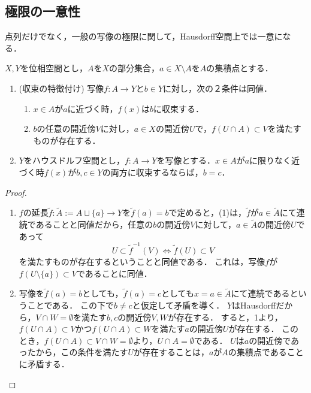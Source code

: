 \documentclass[uplatex,dvipdfmx]{jsreport}
\begin{document}
\subsection{極限の一意性}

\begin{tcolorbox}[colframe=ForestGreen, colback=ForestGreen!10!white,breakable,colbacktitle=ForestGreen!40!white,coltitle=black,fonttitle=\bfseries\sffamily,
title=]
    点列だけでなく，一般の写像の極限に関して，Hausdorff空間上では一意になる．
\end{tcolorbox}

\begin{proposition}[Hausdorff空間では極限は一意的]\label{prop-uniqueness-of-limit-in-Hausdorff-space}
    $X,Y$を位相空間とし，$A$を$X$の部分集合，$a\in X\setminus A$を$A$の集積点とする．
    \begin{enumerate}
        \item (収束の特徴付け) 写像$f:A\to Y$と$b\in Y$に対し，次の２条件は同値．
        \begin{enumerate}[(1)]
            \item $x\in A$が$a$に近づく時，$f(x)$は$b$に収束する．
            \item $b$の任意の開近傍$V$に対し，$a\in X$の開近傍$U$で，$f(U\cap A)\subset V$を満たすものが存在する．
        \end{enumerate}
        \item $Y$をハウスドルフ空間とし，$f:A\to Y$を写像とする．$x\in A$が$a$に限りなく近づく時$f(x)$が$b,c\in Y$の両方に収束するならば，$b=c$．
    \end{enumerate}
\end{proposition}
\begin{proof}\mbox{}
    \begin{enumerate}
        \item $f$の延長$\widetilde{f}:\widetilde{A}:=A\sqcup\{a\}\to Y$を$\widetilde{f}(a)=b$で定めると，(1)は，$\widetilde{f}$が$a\in\widetilde{A}$にて連続であることと同値だから，任意の$b$の開近傍$V$に対して，$a\in\widetilde{A}$の開近傍$U$であって
        \[U\subset\widetilde{f}^{-1}(V)\Leftrightarrow \widetilde{f}(U)\subset V\]
        を満たすものが存在するということと同値である．
        これは，写像$f$が$f(U\setminus\{a\})\subset V$であることに同値．
        \item 
        写像を$\widetilde{f}(a)=b$としても，$\widetilde{f}(a)=c$としても$x=a\in\widetilde{A}$にて連続であるということである．
        この下で$b\ne c$と仮定して矛盾を導く．
        $Y$はHausdorffだから，$V\cap W=\emptyset$を満たす$b,c$の開近傍$V,W$が存在する．
        すると，1より，$f(U\cap A)\subset V$かつ$f(U\cap A)\subset W$を満たす$a$の開近傍$U$が存在する．
        このとき，$f(U\cap A)\subset V\cap W=\emptyset$より，$U\cap A=\emptyset$である．
        $U$は$a$の開近傍であったから，この条件を満たす$U$が存在することは，$a$が$A$の集積点であることに矛盾する．
    \end{enumerate}
\end{proof}
\end{document}
